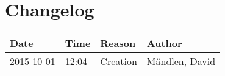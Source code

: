 \chapter{Changelog}

\begin{table}[h]
	\begin{tabularx}{\textwidth}{XXXX}
		Date & Time & Reason & Author\\
		\toprule
		2015-10-01 & 12:04 & Creation & Mändlen, David\\
	\end{tabularx}
\end{table}

